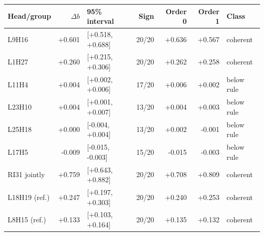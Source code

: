 \begin{tabular}{@{}lrlrrrl@{}}
\toprule
Head/group & $\Delta b$ & 95\% interval & Sign & Order 0 & Order 1 & Class \\
\midrule
L9H16 & +0.601 & [+0.518, +0.688] & 20/20 & +0.636 & +0.567 & coherent \\
L1H27 & +0.260 & [+0.215, +0.306] & 20/20 & +0.262 & +0.258 & coherent \\
L11H4 & +0.004 & [+0.002, +0.006] & 17/20 & +0.006 & +0.002 & below rule \\
L23H10 & +0.004 & [+0.001, +0.007] & 13/20 & +0.004 & +0.003 & below rule \\
L25H18 & +0.000 & [-0.004, +0.004] & 13/20 & +0.002 & -0.001 & below rule \\
L17H5 & -0.009 & [-0.015, -0.003] & 15/20 & -0.015 & -0.003 & below rule \\
RI31 jointly & +0.759 & [+0.643, +0.882] & 20/20 & +0.708 & +0.809 & coherent \\
L18H19 (ref.) & +0.247 & [+0.197, +0.303] & 20/20 & +0.240 & +0.253 & coherent \\
L8H15 (ref.) & +0.133 & [+0.103, +0.164] & 20/20 & +0.135 & +0.132 & coherent \\
\bottomrule
\end{tabular}
